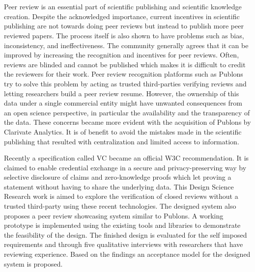 \chapter{\abstractname}

Peer review is an essential part of scientific publishing and scientific knowledge creation. Despite the acknowledged importance, current incentives in scientific publishing are not towards doing peer reviews but instead to publish more peer reviewed papers. The process itself is also shown to have problems such as bias, inconsistency, and ineffectiveness. The community generally agrees that it can be improved by increasing the recognition and incentives for peer reviews. Often, reviews are blinded and cannot be published which makes it is difficult to credit the reviewers for their work. Peer review recognition platforms such as Publons try to solve this problem by acting as trusted third-parties verifying reviews and letting researchers build a peer review resume. However, the ownership of this data under a single commercial entity might have unwanted consequences from an open science perspective, in particular the availability and the transparency of the data. These concerns became more evident with the acquisition of Publons by Clarivate Analytics. It is of benefit to avoid the mistakes made in the scientific publishing that resulted with centralization and limited access to information.

Recently a specification called \acrlong{VC} became an official \acrshort{W3C} recommendation. It is claimed to enable credential exchange in a secure and privacy-preserving way by selective disclosure of claims and zero-knowledge proofs which let proving a statement without having to share the underlying data. This Design Science Research work is aimed to explore the verification of closed reviews without a trusted third-party using these recent technologies. The designed system also proposes a peer review showcasing system similar to Publons. A working prototype is implemented using the existing tools and libraries to demonstrate the feasibility of the design. The finished design is evaluated for the self imposed requirements and through five qualitative interviews with researchers that have reviewing experience. Based on the findings an acceptance model for the designed system is proposed. 

\makeatletter





